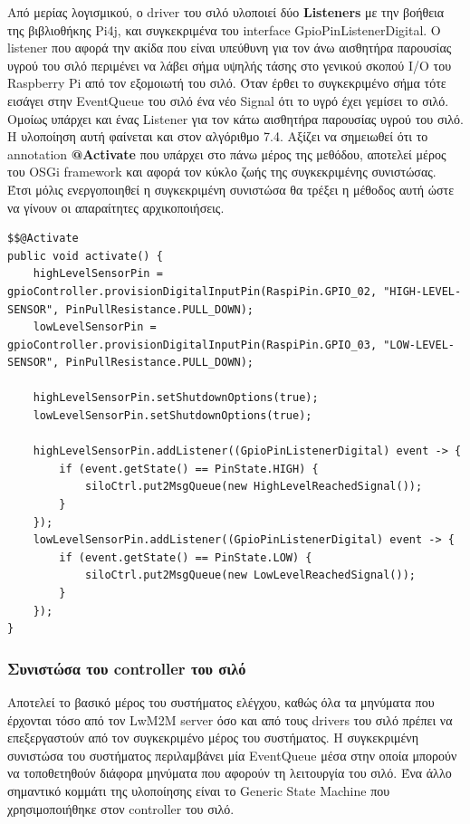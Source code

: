 Από μερίας λογισμικού, ο driver του σιλό υλοποιεί δύο \textbf{Listeners} με την βοήθεια της βιβλιοθήκης Pi4j, και συγκεκριμένα του interface GpioPinListenerDigital. Ο listener που αφορά την ακίδα που είναι υπεύθυνη για τον άνω αισθητήρα παρουσίας υγρού του σιλό περιμένει να λάβει σήμα υψηλής τάσης στο γενικού σκοπού I/O του Raspberry Pi από τον εξομοιωτή του σιλό. Όταν έρθει το συγκεκριμένο σήμα τότε εισάγει στην EventQueue του σιλό ένα νέο Signal ότι το υγρό έχει γεμίσει το σιλό. Ομοίως υπάρχει και ένας Listener για  τον κάτω αισθητήρα παρουσίας υγρού του σιλό. Η υλοποίηση αυτή φαίνεται και στον αλγόριθμο 7.4. Αξίζει να σημειωθεί ότι το annotation \textbf{@Activate} που υπάρχει στο πάνω μέρος της μεθόδου, αποτελεί μέρος του OSGi framework και αφορά τον κύκλο ζωής της συγκεκριμένης συνιστώσας. Έτσι μόλις ενεργοποιηθεί η συγκεκριμένη συνιστώσα θα τρέξει η μέθοδος αυτή ώστε να γίνουν οι απαραίτητες αρχικοποιήσεις.
\newpage
\begin{lstlisting}[caption=Η υλοποίση των listener του driver του σιλό]
$$@Activate
public void activate() {
	highLevelSensorPin = gpioController.provisionDigitalInputPin(RaspiPin.GPIO_02, "HIGH-LEVEL-SENSOR", PinPullResistance.PULL_DOWN);
	lowLevelSensorPin = gpioController.provisionDigitalInputPin(RaspiPin.GPIO_03, "LOW-LEVEL-SENSOR", PinPullResistance.PULL_DOWN);

	highLevelSensorPin.setShutdownOptions(true);
	lowLevelSensorPin.setShutdownOptions(true);

	highLevelSensorPin.addListener((GpioPinListenerDigital) event -> {
		if (event.getState() == PinState.HIGH) {
			siloCtrl.put2MsgQueue(new HighLevelReachedSignal());
		}
	});
	lowLevelSensorPin.addListener((GpioPinListenerDigital) event -> {
		if (event.getState() == PinState.LOW) {
			siloCtrl.put2MsgQueue(new LowLevelReachedSignal());
		}
	});
}
\end{lstlisting}

\subsubsection{Συνιστώσα του controller του σιλό}
Αποτελεί το βασικό μέρος του συστήματος ελέγχου, καθώς όλα τα μηνύματα που έρχονται τόσο από τον LwM2M server όσο και από τους drivers του σιλό πρέπει να επεξεργαστούν από τον συγκεκριμένο μέρος του συστήματος. Η συγκεκριμένη συνιστώσα του συστήματος περιλαμβάνει μία EventQueue μέσα στην οποία μπορούν να τοποθετηθούν διάφορα μηνύματα που αφορούν τη λειτουργία του σιλό. Ένα άλλο σημαντικό κομμάτι της υλοποίησης είναι το Generic State Machine που χρησιμοποιήθηκε στον controller του σιλό. 

